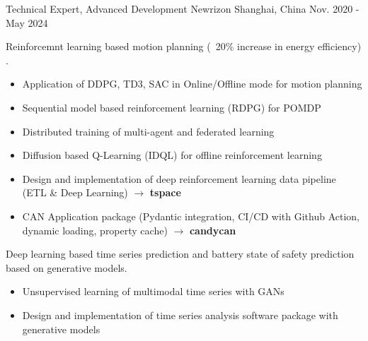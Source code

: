 \documentclass[../cv.tex]{subfiles}
\begin{document}


\begin{cventries}

	\cventry
	{Technical Expert, Advanced Development} %
	{Newrizon} %
	{Shanghai, China} %
	{Nov. 2020 - May 2024} %
	{
		\begin{cvitems} %
			\item Reinforcemnt learning based motion planning (~20\% increase in energy efficiency)
			\supercite{Xin_VEOS_22} \supercite{Xin_Fu_Pan_Simulation_Test_RL_22} \supercite{Pan_Xin_DrvStyle_23}.
			\begin{itemize}
				\item Application of DDPG, TD3, SAC in Online/Offline mode for motion planning
				\item Sequential model based reinforcement learning (RDPG)  for POMDP
				\item Distributed training of multi-agent and federated learning
				\item Diffusion based Q-Learning (IDQL) for offline reinforcement learning
				\item Design and implementation of deep reinforcement learning data pipeline (ETL \& Deep Learning)
				      $\rightarrow$ \textbf{tspace} \href{https://binjian.github.io/tspace/}{\faGithub}
				\item CAN Application package (Pydantic integration, CI/CD with Github Action, dynamic loading, property cache)
				      $\rightarrow$ \textbf{candycan} \href{https://binjian.github.io/candycan/}{\faGithub}
			\end{itemize}
			\item Deep learning based time series prediction and battery state of safety prediction based on generative models. \supercite{Xin_GenAI_23} \supercite{Xin_Chen_NN_TSFeatures_23}
			\begin{itemize}
				\item Unsupervised learning of multimodal time series with GANs
				\item Design and implementation of time series analysis software package with generative models

\end{itemize}
\end{cvitems}}
\end{cventries}
\end{document}

